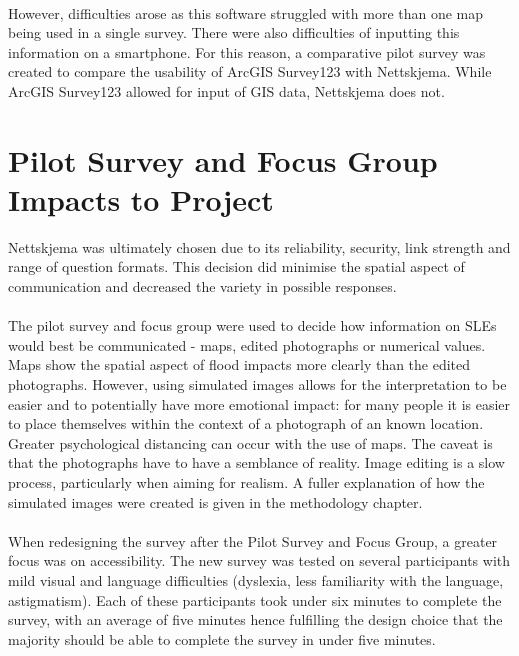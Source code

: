\paragraph{}

However, difficulties arose as this software struggled with more than one map being used in a single survey. There were also difficulties of inputting this information on a smartphone. For this reason, a comparative pilot survey was created to compare the usability of ArcGIS Survey123 with Nettskjema. While ArcGIS Survey123 allowed for input of GIS data, Nettskjema does not.

\section{Pilot Survey and Focus Group Impacts to Project}
Nettskjema was ultimately chosen due to its reliability, security, link strength and range of question formats.  This decision did minimise the spatial aspect of communication and decreased the variety in possible responses. 
\paragraph{}
The pilot survey and focus group were used to decide how information on SLEs would best be communicated - maps, edited photographs or numerical values. Maps show the spatial aspect of flood impacts more clearly than the edited photographs. However, using simulated images allows for the interpretation to be easier and to potentially have more emotional impact: for many people it is easier to place themselves within the context of a photograph of an known location. Greater psychological distancing can occur with the use of maps. The caveat is that the photographs have to have a semblance of reality. Image editing is a slow process, particularly when aiming for realism.  A fuller explanation of how the simulated images were created is given in the methodology chapter. 
\paragraph{}

When redesigning the survey after the Pilot Survey and Focus Group, a greater focus was on accessibility. The new survey was tested on several participants with mild visual and language difficulties (dyslexia, less familiarity with the language, astigmatism).  Each of these participants took under six minutes to complete the survey, with an average of five minutes hence fulfilling the design choice that the majority should be able to complete the survey in under five minutes. 
